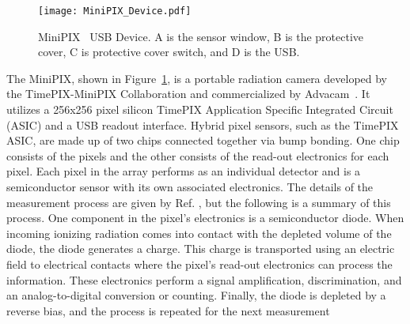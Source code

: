 %
\begin{figure}[H] %
    \centering
    \texttt{[image: MiniPIX\_Device.pdf]} 
    \caption{MiniPIX~\cite{advacam} USB Device. A is the sensor window, B is the protective cover, C is protective cover switch, and D is the USB.}
    \label{fig:minipix_usb}
\end{figure}
%
The MiniPIX, shown in Figure~\ref{fig:minipix_usb}, is a portable radiation camera developed by the TimePIX-MiniPIX Collaboration and commercialized by Advacam~\cite{advacam}.  It utilizes a 256x256 pixel silicon TimePIX Application Specific Integrated Circuit (ASIC) and a USB readout interface. Hybrid pixel sensors, such as the TimePIX ASIC, are made up of two chips connected together via bump bonding. One chip consists of the pixels and the other consists of the read-out electronics for each pixel. Each pixel in the array performs as an individual detector and is a semiconductor sensor with its own associated electronics. The details of the measurement process are given by Ref. \cite{jakubek-pixel-detectors}, but the following is a summary of this process. One component in the pixel's electronics is a semiconductor diode. When incoming ionizing radiation comes into contact with the depleted volume of the diode, the diode generates a charge. This charge is transported using an electric field to electrical contacts where the pixel's read-out electronics can process the information. These electronics perform a signal amplification, discrimination, and an analog-to-digital conversion or counting. Finally, the diode is depleted by a reverse bias, and the process is repeated for the next measurement

